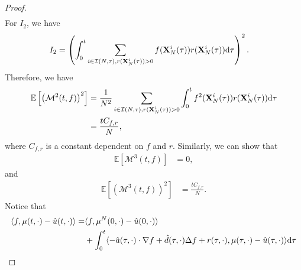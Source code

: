 \documentclass[preprint,12pt]{elsarticle}
\theoremstyle{definition}
\theoremstyle{remark}
\begin{document}
\begin{proof}
\begin{equation*}
\begin{aligned}
    \end{aligned}
\end{equation*}
For $I_2$, we have
\begin{equation*}
    \begin{aligned}
        I_2 &= \left(\int_0^{t} \sum_{i\in \mathcal I(N,\tau), r(\mathbf{X}^i_N(\tau))>0}  f(\mathbf{X}_N^i(\tau))r(\mathbf{X}_N^i(\tau))\mathrm{d} \tau\right)^2.
    \end{aligned}
\end{equation*}
Therefore, we have
$$
\begin{aligned}
\mathbb E\left[ \left(\mathcal M^2(t,f) \right)^2\right] &= \frac{1}{N^2}\sum_{i\in \mathcal I(N,\tau), r(\mathbf{X}^i_N(\tau))>0}\int_0^{t}f^2(\mathbf{X}_N^i(\tau))r(\mathbf{X}_N^i(\tau)) \mathrm{d} \tau\\
    & = \frac{t C_{f,r}}{N},
\end{aligned}
$$
where $C_{f,r}$ is a constant dependent on $f$ and $r$. Similarly, we can show that 
$$
\begin{aligned}
\mathbb E\left[ \mathcal M^3(t,f) \right] 
    & = 0,
\end{aligned}
$$
and 
$$
\begin{aligned}
\mathbb E\left[ \left(\mathcal M^3(t,f) \right)^2\right] 
    & = \frac{t C_{f,r}}{N}.
\end{aligned}
$$
Notice that 
\begin{equation*}
    \begin{aligned}
         \langle f,\mu(t,\cdot)-\hat u(t,\cdot) \rangle = &\langle f, \mu^N(0,\cdot)-\hat u(0,\cdot)\rangle \\
         &  +\int_0^t\langle -\hat a(\tau ,\cdot )\cdot \nabla f  + \hat d(\tau, \cdot) \Delta f+r(\tau,\cdot),\mu(\tau,\cdot)-\hat u(\tau,\cdot)\rangle\intd \tau\\

\end{aligned}
\end{equation*}
\end{proof}
\end{document}
